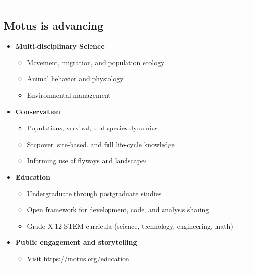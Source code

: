 \documentclass[
]{article}
\providecommand{\tightlist}{%
  \setlength{\itemsep}{0pt}\setlength{\parskip}{0pt}}
\begin{document}
\begin{center}\rule{0.5\linewidth}{0.5pt}\end{center}

\hypertarget{motus-is-advancing}{%
\subsection{Motus is advancing}\label{motus-is-advancing}}

\begin{itemize}
\tightlist
\item
  \textbf{Multi-disciplinary Science}

  \begin{itemize}
  \tightlist
  \item
    Movement, migration, and population ecology
  \item
    Animal behavior and physiology
  \item
    Environmental management
  \end{itemize}
\item
  \textbf{Conservation}

  \begin{itemize}
  \tightlist
  \item
    Populations, survival, and species dynamics
  \item
    Stopover, site-based, and full life-cycle knowledge
  \item
    Informing use of flyways and landscapes
  \end{itemize}
\item
  \textbf{Education}

  \begin{itemize}
  \tightlist
  \item
    Undergraduate through postgraduate studies
  \item
    Open framework for development, code, and analysis sharing
  \item
    Grade X-12 STEM curricula (science, technology, engineering, math)
  \end{itemize}
\item
  \textbf{Public engagement and storytelling}

  \begin{itemize}
  \tightlist
  \item
    Visit \url{https://motus.org/education}
  \end{itemize}
\end{itemize}

\begin{center}\rule{0.5\linewidth}{0.5pt}\end{center}
\end{document}
